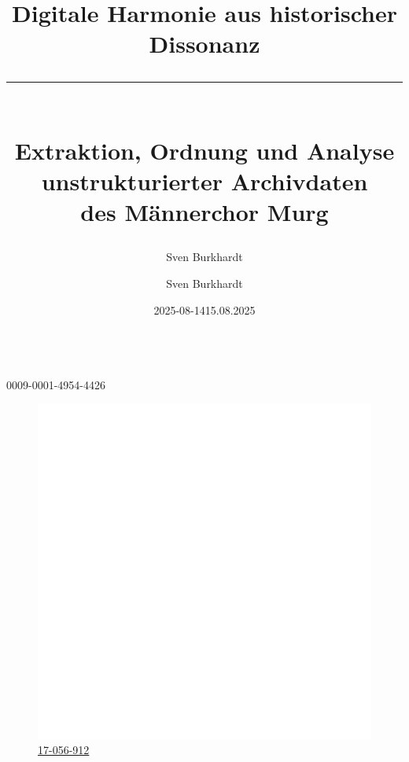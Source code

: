 \documentclass[12pt, a4paper, ngerman, bidi=default]{article}
\title{\vspace*{4cm} \LARGE Digitale Harmonie aus historischer Dissonanz
\color{UniMint} \rule{8cm}{1pt} \\  
\vspace{0.2cm}  
\color{white}\large Extraktion, Ordnung und Analyse\\unstrukturierter Archivdaten\\des Männerchor Murg}
\subtitle{}
\author{Sven Burkhardt}
\date{2025-08-14}%
\begin{document}
\begin{titlepage}
    
\color{white}
\pagecolor[HTML]{46505A} %
\date{}
\author{}
\maketitle
\begin{center}
  \author{\LARGE{\author{\vspace{-0.5cm}Sven Burkhardt}}}\\
  \vspace{4mm}
  \large{ {0009-0001-4954-4426}}\\%
  \begin{figure}[h]
    \centering
    \color{white}
    \large{\href{https://dhlab.philhist.unibas.ch/en/persons/sven-burkhardt/}{{\hspace*{0.5mm}\includegraphics[height=4.5
  mm]{./assets/Logos/Uni_basel_logo_white.png}}\hspace{3.4mm}\color{white} 17-056-912}}\\%
    \date{\hspace*{2mm}15.08.2025}%
  \end{figure}
  \setcounter{figure}{0}
\end{center}



\end{titlepage}
\end{document}
